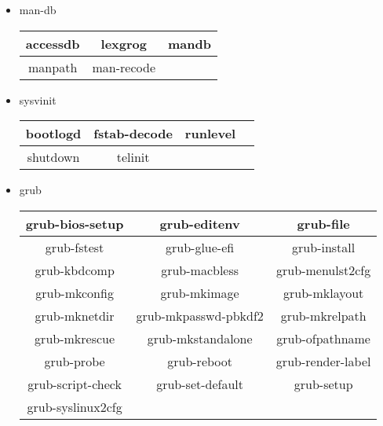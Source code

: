 \begin{itemize}
    \item man-db
        \begin{center}
            \begin{tabular}{|c|c|c|}
                \hline
                accessdb & lexgrog & mandb \\
                \hline
                manpath & man-recode \\
                \cline{1-2}
            \end{tabular}
        \end{center}
    \item sysvinit
        \begin{center}
            \begin{tabular}{|c|c|c|c|}
                \hline
                bootlogd & fstab-decode & runlevel \\
                \hline
                shutdown & telinit \\
                \cline{1-2}
            \end{tabular}
        \end{center}
    \item grub
        \begin{center}
            \begin{tabular}{|c|c|c|}
                \hline
                grub-bios-setup & grub-editenv & grub-file \\
                \hline
                grub-fstest & grub-glue-efi & grub-install \\
                \hline
                grub-kbdcomp & grub-macbless & grub-menulst2cfg \\
                \hline
                grub-mkconfig & grub-mkimage & grub-mklayout \\
                \hline
                grub-mknetdir & grub-mkpasswd-pbkdf2 & grub-mkrelpath \\
                \hline
                grub-mkrescue & grub-mkstandalone & grub-ofpathname \\
                \hline
                grub-probe & grub-reboot & grub-render-label \\
                \hline
                grub-script-check & grub-set-default & grub-setup \\
                \hline
                grub-syslinux2cfg \\
                \cline{1-1}
            \end{tabular}
        \end{center}

\end{itemize}
